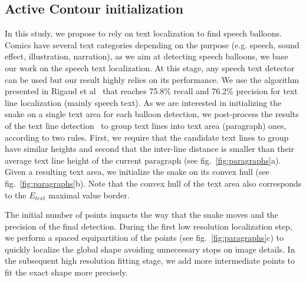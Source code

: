\documentclass[conference]{IEEEtran}
\begin{document}
\subsection{Active Contour initialization}
\label{sec:cont_init}
In this study, we propose to rely on text localization to find speech balloons. Comics have several text categories depending on the purpose (e.g. speech, sound effect, illustration, narration), as we aim at detecting speech balloons, we base our work on the speech text localization. At this stage, any speech text detector can be used but our result highly relies on its performance. We use the algorithm presented in Rigaud et al~\cite{Rigaud2013VISAPP} that reaches 75.8\% recall and 76.2\% precision for text line localization (mainly speech text).
As we are interested in initializing the snake on a single text area for each balloon detection, we post-process the results of the text line detection~\cite{Rigaud2013VISAPP} to group text lines into text area (paragraph) ones, according to two rules. First, we require that the candidate text lines to group have similar heights and second that the inter-line distance is smaller than their average text line height of the current paragraph (see fig.~\ref{fig:paragraphs}a).
Given a resulting text area, we initialize the snake on its convex hull (see fig.~\ref{fig:paragraphs}b). Note that the convex hull of the text area also corresponds to the $E_{text}$ maximal value border. %



The initial number of points impacts the way that the snake moves and the precision of the final detection. During the first low resolution localization step, we perform a spaced equipartition of the points (see fig.~\ref{fig:paragraphs}c) to quickly localize the global shape avoiding unnecessary stops on image details. In the subsequent high resolution fitting stage, we add more intermediate points to fit the exact shape more precisely.%
\end{document}
